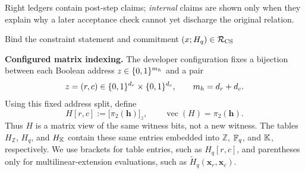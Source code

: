 Right ledgers contain post-step claims; \emph{internal} claims are shown only
when they explain why a later acceptance check cannot yet discharge the
original relation.

\setlength{\textwidth}{5.63in}
\setlength{\columnwidth}{5.63in}
\setlength{\linewidth}{5.63in}
\setlength{\hsize}{5.63in}
\setlength{\marginparwidth}{1.72in}
\setlength{\marginparsep}{0.10in}

\begin{pvstep}{Bind the constraint statement and commitment}{%
  \clgnewrel{\idCS}
    {$(x;H_q)\in\mathcal R_{\rm CS}$}%
}
\begin{pvexchange}
\end{pvexchange}
\end{pvstep}

\smallskip
\noindent\textbf{Configured matrix indexing.}
The developer configuration fixes a bijection between each Boolean address
$z\in\{0,1\}^{m_h}$ and a pair
\[
 z=(r,c)\in\{0,1\}^{d_r}\times\{0,1\}^{d_c},
 \qquad m_h=d_r+d_c.
\]
Using this fixed address split, define
\[
 H[r,c]:=\bigl[\pi_2(\bm h)\bigr]_z,
 \qquad
 \operatorname{vec}(H)=\pi_2(\bm h).
\]
Thus $H$ is a matrix view of the same witness bits, not a new witness.  The
tables $H_{\mathbb Z}$, $H_q$, and $H_{\mathbb K}$ contain these same entries embedded
into $\mathbb Z$, $\mathbb F_q$, and $\mathbb K$, respectively.  We use brackets for table
entries, such as $H_q[r,c]$, and parentheses only for multilinear-extension
evaluations, such as $\widetilde H_q(\bm x_r,\bm x_c)$.


